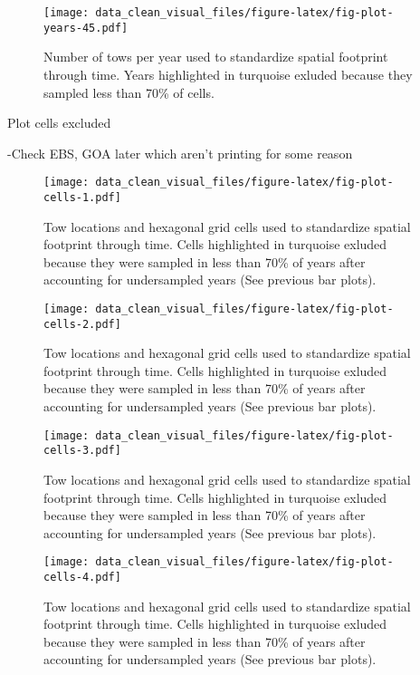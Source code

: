 \documentclass[
]{article}
\begin{document}
\begin{figure}
\centering
\texttt{[image: data\_clean\_visual\_files/figure-latex/fig-plot-years-45.pdf]}
\caption{\label{fig:fig-plot-years-45}Number of tows per year used to standardize spatial footprint through time. Years highlighted in turquoise exluded because they sampled less than 70\% of cells.}
\end{figure}

Plot cells excluded

-Check EBS, GOA later which aren't printing for some reason

\begin{figure}
\centering
\texttt{[image: data\_clean\_visual\_files/figure-latex/fig-plot-cells-1.pdf]}
\caption{\label{fig:fig-plot-cells-1}Tow locations and hexagonal grid cells used to standardize spatial footprint through time. Cells highlighted in turquoise exluded because they were sampled in less than 70\% of years after accounting for undersampled years (See previous bar plots).}
\end{figure}

\begin{figure}
\centering
\texttt{[image: data\_clean\_visual\_files/figure-latex/fig-plot-cells-2.pdf]}
\caption{\label{fig:fig-plot-cells-2}Tow locations and hexagonal grid cells used to standardize spatial footprint through time. Cells highlighted in turquoise exluded because they were sampled in less than 70\% of years after accounting for undersampled years (See previous bar plots).}
\end{figure}

\begin{figure}
\centering
\texttt{[image: data\_clean\_visual\_files/figure-latex/fig-plot-cells-3.pdf]}
\caption{\label{fig:fig-plot-cells-3}Tow locations and hexagonal grid cells used to standardize spatial footprint through time. Cells highlighted in turquoise exluded because they were sampled in less than 70\% of years after accounting for undersampled years (See previous bar plots).}
\end{figure}

\begin{figure}
\centering
\texttt{[image: data\_clean\_visual\_files/figure-latex/fig-plot-cells-4.pdf]}
\caption{\label{fig:fig-plot-cells-4}Tow locations and hexagonal grid cells used to standardize spatial footprint through time. Cells highlighted in turquoise exluded because they were sampled in less than 70\% of years after accounting for undersampled years (See previous bar plots).}
\end{figure}
\end{document}
